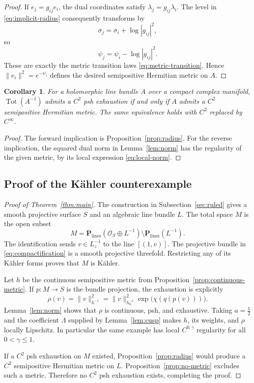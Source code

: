 \documentclass[11pt]{amsart}
\newtheorem{corollary}[theorem]{Corollary}
\theoremstyle{definition}
\theoremstyle{remark}
\numberwithin{equation}{section}
\newcommand{\PP}{\mathbf P}
\newcommand{\OO}{\mathcal O}
\newcommand{\Tot}{\operatorname{Tot}}
\begin{document}
\begin{proof}
If $e_j=g_{ij}e_i$, the dual coordinates satisfy
$\lambda_j=g_{ij}\lambda_i$. The level in
\eqref{eq:implicit-radius} consequently transforms by
\[
 \sigma_j=\sigma_i+\log|g_{ij}|^2,
\]
so
\[
 \psi_j=\psi_i-\log|g_{ij}|^2.
\]
These are exactly the metric transition laws
\eqref{eq:metric-transition}. Hence $\|e_i\|^2=e^{-\psi_i}$ defines
the desired semipositive Hermitian metric on $A$.
\end{proof}

\begin{corollary}\label{cor:criterion}
For a holomorphic line bundle $A$ over a compact complex manifold,
$\Tot(A^{-1})$ admits a $C^2$ psh exhaustion if and only if $A$ admits
a $C^2$ semipositive Hermitian metric. The same equivalence holds with
$C^2$ replaced by $C^\infty$.
\end{corollary}

\begin{proof}
The forward implication is Proposition~\ref{prop:radius}. For the
reverse implication, the squared dual norm in Lemma~\ref{lem:norm}
has the regularity of the given metric, by its local expression
\eqref{eq:local-norm}.
\end{proof}

\subsection{Proof of the K\"ahler counterexample}\label{sec:conclusion}

\begin{proof}[Proof of Theorem~\ref{thm:main}]
The construction in Subsection~\ref{sec:ruled} gives a smooth projective
surface $S$ and an algebraic line bundle $L$. The total space $M$ is
the open subset
\begin{equation}\label{eq:compactification}
 M=\PP_{\mathrm{lines}}(\OO_S\oplus L^{-1})
       \setminus\PP_{\mathrm{lines}}(L^{-1}).
\end{equation}
The identification sends $v\in L^{-1}_z$ to the line $[(1,v)]$.
The projective bundle in \eqref{eq:compactification} is a smooth
projective threefold. Restricting any of its K\"ahler forms proves
that $M$ is K\"ahler.

Let $h$ be the continuous semipositive metric from
Proposition~\ref{prop:continuous-metric}. If $p:M\to S$ is the bundle
projection, the exhaustion is explicitly
\begin{equation}\label{eq:explicit-exhaustion}
 \rho(v)=\|v\|_{h^{-1}}^2
       =\|v\|_{h_0^{-1}}^2
          \exp\!\bigl(\chi(q(p(v)))\bigr).
\end{equation}
Lemma~\ref{lem:norm} shows that $\rho$ is continuous, psh, and
exhaustive. Taking $a=\tfrac12$ and the coefficient $\Lambda$ supplied
by Lemma~\ref{lem:cusp} makes $h$, its weights, and $\rho$ locally
Lipschitz. In particular the same example has local $C^{0,\gamma}$
regularity for all $0<\gamma\le1$.

If a $C^2$ psh exhaustion on $M$ existed,
Proposition~\ref{prop:radius} would produce a $C^2$ semipositive
Hermitian metric on $L$. Proposition~\ref{prop:no-metric} excludes
such a metric. Therefore no $C^2$ psh exhaustion exists, completing
the proof.
\end{proof}
\end{document}
